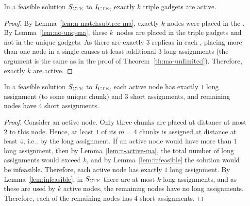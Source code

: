 \begin{lemma}
  In a feasible solution $S_{\mathrm{\textsc{CTE}}}$ to $I_{\mathrm{\textsc{CTE}}}$, exactly $k$ triple gadgets are active.
  \label{lem:n-active-ma}
\end{lemma}
\begin{proof}
  By Lemma~\ref{lem:n-matchsubtree-ma}, exactly $k$ nodes were placed in the \MatchSubtree{}.
  By Lemma~\ref{lem:no-unq-ma}, these $k$~nodes are placed in the triple gadgets and not in the unique gadgets.
As there are exactly $3$ replicas in each \TripleGadget{}, placing more than one node in a single \TripleGadget{} causes at least additional $3$ long assignments (the argument is the same as in the proof of Theorem~\ref{th:ma-unlimited}).
Therefore, exactly $k$ \TripleGadgets{} are active.
\end{proof}

\begin{lemma}
  In a feasible solution $S_{\mathrm{\textsc{CTE}}}$ to $I_{\mathrm{\textsc{CTE}}}$, each active node has exactly $1$ long assignment (to some unique chunk) and $3$ short assignments, and remaining nodes have $4$ short assignments.
  \label{lem:assignment-length}
\end{lemma}
\begin{proof}
  Consider an active node. Only three chunks are placed at distance at most $2$ to this node. Hence, at least $1$ of its $m = 4$ chunks is assigned at distance at least $4$, i.e., by the long assignment.
  If an active node would have more than $1$ long assignment, then by Lemma~\ref{lem:n-active-ma}, the total number of long assignments would exceed $k$, and by Lemma~\ref{lem:infeasible} the solution would be infeasible.
  Therefore, each active node has exactly $1$ long assignment.
  By Lemma~\ref{lem:infeasible}, in $S_{\mathrm{\textsc{CTE}}}$ there are at most $k$ long assignments, and as these are used by $k$ active nodes, the remaining nodes have no long assignments.
  Therefore, each of the remaining nodes has $4$ short assignments.
\end{proof}


